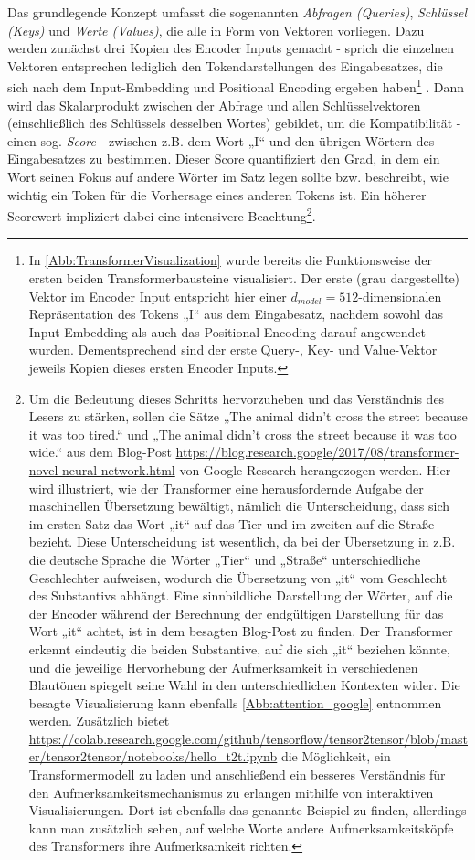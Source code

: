 Das grundlegende Konzept umfasst die sogenannten \emph{Abfragen (Queries)}, \emph{Schlüssel (Keys)} und \emph{Werte (Values)}, die alle in Form von Vektoren vorliegen. Dazu werden zunächst drei Kopien des Encoder Inputs gemacht - sprich die einzelnen Vektoren entsprechen lediglich den Tokendarstellungen des Eingabesatzes, die sich nach dem Input-Embedding und Positional Encoding ergeben haben\footnote{In \cref{Abb:TransformerVisualization} wurde bereits die Funktionsweise der ersten beiden Transformerbausteine visualisiert. Der erste (grau dargestellte) Vektor im Encoder Input entspricht hier einer $d_{model}=512$-dimensionalen Repräsentation des Tokens „I“ aus dem Eingabesatz, nachdem sowohl das Input Embedding als auch das Positional Encoding darauf angewendet wurden. Dementsprechend sind der erste Query-, Key- und Value-Vektor jeweils Kopien dieses ersten Encoder Inputs.} \cite{Mathematical_view_of_attention_models_in_deep_learning}. Dann wird das Skalarprodukt zwischen der Abfrage und allen Schlüsselvektoren (einschließlich des Schlüssels desselben Wortes) gebildet, um die Kompatibilität - einen sog. \emph{Score} - zwischen z.B. dem Wort „I“ und den übrigen Wörtern des Eingabesatzes zu bestimmen. Dieser Score quantifiziert den Grad, in dem ein Wort seinen Fokus auf andere Wörter im Satz legen sollte bzw. beschreibt, wie wichtig ein Token für die Vorhersage eines anderen Tokens ist. Ein höherer Scorewert impliziert dabei eine intensivere Beachtung\footnote{Um die Bedeutung dieses Schritts hervorzuheben und das Verständnis des Lesers zu stärken, sollen die Sätze „The animal didn't cross the street because it was too tired.“ und „The animal didn't cross the street because it was too wide.“ aus dem Blog-Post \url{https://blog.research.google/2017/08/transformer-novel-neural-network.html} von Google Research herangezogen werden. Hier wird illustriert, wie der Transformer eine herausfordernde Aufgabe der maschinellen Übersetzung bewältigt, nämlich die Unterscheidung, dass sich im ersten Satz das Wort „it“ auf das Tier und im zweiten auf die Straße bezieht. Diese Unterscheidung ist wesentlich, da bei der Übersetzung in z.B. die deutsche Sprache die Wörter „Tier“ und „Straße“ unterschiedliche Geschlechter aufweisen, wodurch die Übersetzung von „it“ vom Geschlecht des Substantivs abhängt. Eine sinnbildliche Darstellung der Wörter, auf die der Encoder während der Berechnung der endgültigen Darstellung für das Wort „it“ achtet, ist in dem besagten Blog-Post zu finden. Der Transformer erkennt eindeutig die beiden Substantive, auf die sich „it“ beziehen könnte, und die jeweilige Hervorhebung der Aufmerksamkeit in verschiedenen Blautönen spiegelt seine Wahl in den unterschiedlichen Kontexten wider. Die besagte Visualisierung kann ebenfalls \cref{Abb:attention_google} entnommen werden. Zusätzlich bietet \url{https://colab.research.google.com/github/tensorflow/tensor2tensor/blob/master/tensor2tensor/notebooks/hello_t2t.ipynb} die Möglichkeit, ein Transformermodell zu laden und anschließend ein besseres Verständnis für den Aufmerksamkeitsmechanismus zu erlangen mithilfe von interaktiven Visualisierungen. Dort ist ebenfalls das genannte Beispiel zu finden, allerdings kann man zusätzlich sehen, auf welche Worte andere Aufmerksamkeitsköpfe des Transformers ihre Aufmerksamkeit richten.}. 

